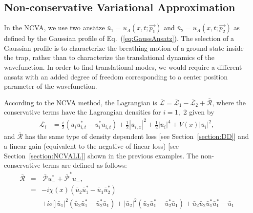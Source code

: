 {\subsection{Non-conservative Variational Approximation}
In the NCVA, we use two ans\"atze $\bar{u}_1= u_A(x,t; \vec{p_1})$ and $\bar{u}_2=u_A(x,t; \vec{p_2})$ as defined by the Gaussian profile of Eq.~(\ref{eq:GaussAnsatz}).  The selection of a Gaussian profile is to characterize the breathing motion of a ground state inside the trap, rather than to characterize the translational dynamics of the wavefunction.  In order to find translational modes, we would require a different ansatz with an added degree of freedom corresponding to a center position parameter of the wavefunction.

According to the NCVA method, the Lagrangian is $\bar{\mathcal{L}} = \bar{\mathcal{L}}_1 - \bar{\mathcal{L}}_2 +\bar{\mathcal{R}}$, where the conservative terms have the Lagrangian densities for $i= 1,$ 2 given by 
\begin{eqnarray}
\bar{\mathcal{L}_i} &= \frac{i}{2} \left(\bar{u}_i \bar{u}_{i,t}^* - 
\bar{u}_i^* \bar{u}_{i,t}\right) + \frac{1}{2} |\bar{u}_{i,x}|^2 + \frac{1}{2}|\bar{u}_i|^4 + V(x) |\bar{u}_i|^2,
\end{eqnarray}
and $\bar{\mathcal{R}}$ has the same type of density dependent loss [see Section~\ref{section:DD}] and a linear gain (equivalent to the negative of linear loss)  [see Section~\ref{section:NCVALL}] shown in the previous examples.  The non-conservative terms are defined as follows:
\begin{eqnarray}
\bar{\mathcal{R} }&=& \, \bar{\mathcal{P}} u_-^*+ \bar{\mathcal{P}}^*u_-,  \\
&=& -i \chi(x) \left( \bar{u}_2 \bar{u}_1^* -  \bar{u}_1  \bar{u}_2^* \right) \\ \nonumber
&& + i\sigma [ | \bar{u}_1|^2 \left(  \bar{u}_2  \bar{u}_1^* -  \bar{u}_2^*  
\bar{u}_1 \right) +  | \bar{u}_2|^2 \left(  \bar{u}_2  \bar{u}_1^*  - \bar{u}_2^*  \bar{u}_1 \right) +  \bar{u}_2  \bar{u}_2  \bar{u}_1^*  \bar{u}_1^* -  \bar{u}_1  

\end{eqnarray}}

